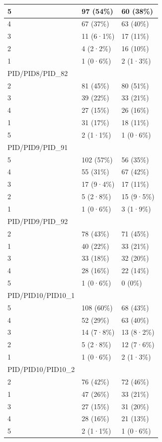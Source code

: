\documentclass[
]{book}
\begin{document}
\begin{tabular}{l|l|l}
\hline
5 & 97 (54\%) & 60 (38\%)\\
\hline
4 & 67 (37\%) & 63 (40\%)\\
\hline
3 & 11 (6·1\%) & 17 (11\%)\\
\hline
2 & 4 (2·2\%) & 16 (10\%)\\
\hline
1 & 1 (0·6\%) & 2 (1·3\%)\\
\hline
PID/PID8/PID\_82 &  & \\
\hline
2 & 81 (45\%) & 80 (51\%)\\
\hline
3 & 39 (22\%) & 33 (21\%)\\
\hline
4 & 27 (15\%) & 26 (16\%)\\
\hline
1 & 31 (17\%) & 18 (11\%)\\
\hline
5 & 2 (1·1\%) & 1 (0·6\%)\\
\hline
PID/PID9/PID\_91 &  & \\
\hline
5 & 102 (57\%) & 56 (35\%)\\
\hline
4 & 55 (31\%) & 67 (42\%)\\
\hline
3 & 17 (9·4\%) & 17 (11\%)\\
\hline
2 & 5 (2·8\%) & 15 (9·5\%)\\
\hline
1 & 1 (0·6\%) & 3 (1·9\%)\\
\hline
PID/PID9/PID\_92 &  & \\
\hline
2 & 78 (43\%) & 71 (45\%)\\
\hline
1 & 40 (22\%) & 33 (21\%)\\
\hline
3 & 33 (18\%) & 32 (20\%)\\
\hline
4 & 28 (16\%) & 22 (14\%)\\
\hline
5 & 1 (0·6\%) & 0 (0\%)\\
\hline
PID/PID10/PID10\_1 &  & \\
\hline
5 & 108 (60\%) & 68 (43\%)\\
\hline
4 & 52 (29\%) & 63 (40\%)\\
\hline
3 & 14 (7·8\%) & 13 (8·2\%)\\
\hline
2 & 5 (2·8\%) & 12 (7·6\%)\\
\hline
1 & 1 (0·6\%) & 2 (1·3\%)\\
\hline
PID/PID10/PID10\_2 &  & \\
\hline
2 & 76 (42\%) & 72 (46\%)\\
\hline
1 & 47 (26\%) & 33 (21\%)\\
\hline
3 & 27 (15\%) & 31 (20\%)\\
\hline
4 & 28 (16\%) & 21 (13\%)\\
\hline
5 & 2 (1·1\%) & 1 (0·6\%)\\

\end{tabular}
\end{document}

